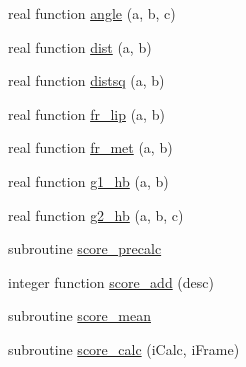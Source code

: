 \begin{DoxyCompactItemize}
\item 
real function \hyperlink{classcalc__chemscore_a8af51a917f080c281be0bce50c1e6d76}{angle} (a, b, c)
\item 
real function \hyperlink{classcalc__chemscore_aae7e243df77ac184d4fcd6cff5b0c0f2}{dist} (a, b)
\item 
real function \hyperlink{classcalc__chemscore_a0538eec23e42416be4896f6501beec20}{distsq} (a, b)
\item 
real function \hyperlink{classcalc__chemscore_aa375f714a981f45d8700a8ad88e7a000}{fr\-\_\-lip} (a, b)
\item 
real function \hyperlink{classcalc__chemscore_a3ce8ab0790256615b1d72e31ab89ce59}{fr\-\_\-met} (a, b)
\item 
real function \hyperlink{classcalc__chemscore_a43c74c5136c8bd28466d9be8129c0c41}{g1\-\_\-hb} (a, b)
\item 
real function \hyperlink{classcalc__chemscore_ad76a52480cfdcf6a556fd98bab1a3f5a}{g2\-\_\-hb} (a, b, c)
\item 
subroutine \hyperlink{classcalc__chemscore_a1dbdeb7c4eb3b9068a041f3b08224417}{score\-\_\-precalc}
\item 
integer function \hyperlink{classcalc__chemscore_a8ac120993f6d7fd6a2d13d1de1ef8a04}{score\-\_\-add} (desc)
\item 
subroutine \hyperlink{classcalc__chemscore_a745d266685ca3b123d11d20d0baf1dec}{score\-\_\-mean}
\item 
subroutine \hyperlink{classcalc__chemscore_a678c1ccc18920a66c00a8fe528997561}{score\-\_\-calc} (i\-Calc, i\-Frame)
\end{DoxyCompactItemize}
